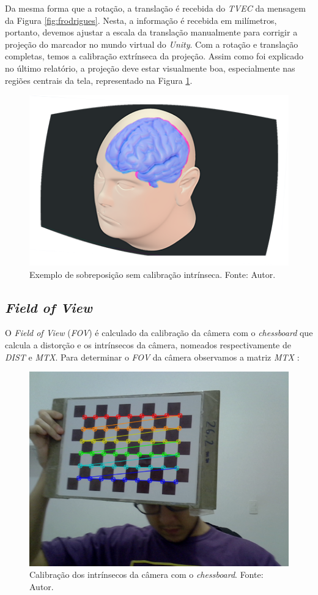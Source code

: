 Da mesma forma que a rotação, a translação é recebida do \textit{TVEC} da mensagem da Figura \ref{fig:frodrigues}. Nesta, a informação é recebida em milímetros, portanto, devemos ajustar a escala da translação manualmente para corrigir a projeção do marcador no mundo virtual do \textit{Unity}. Com a rotação e translação completas, temos a calibração extrínseca da projeção. Assim como foi explicado no último relatório, a projeção deve estar visualmente boa, especialmente nas regiões centrais da tela, representado na Figura \ref{fig:Extrinsecos}.

\begin{figure}[ht]
    \centering
    \includegraphics[width=.45\linewidth]{figuras/CalibExtr.png}
    \caption{Exemplo de sobreposição sem calibração intrínseca. Fonte: Autor.}
    \label{fig:Extrinsecos}
\end{figure}

\subsection{\textit{Field of View}}

O \textit{Field of View} (\textit{FOV}) é calculado da calibração da câmera com o \textit{chessboard} que calcula a distorção e os intrínsecos da câmera, nomeados respectivamente de \textit{DIST} e \textit{MTX}. Para determinar o \textit{FOV} da câmera observamos a matriz \textit{MTX} \cite{Calibration}:

\begin{figure}[ht]
    \centering
    \includegraphics[width=.45\linewidth]{figuras/chessboard.png}
    \caption{Calibração dos intrínsecos da câmera com o \textit{chessboard}. Fonte: Autor.}
    \label{fig:chess_calib}
\end{figure}

